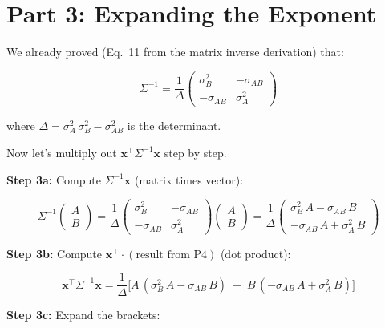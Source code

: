 \documentclass[11pt, a4paper]{article}
\begin{document}
\section*{\color{secblue}Part 3: Expanding the Exponent}

We already proved (Eq.~11 from the matrix inverse derivation) that:

\begin{equation}
\Sigma^{-1} = \frac{1}{\Delta}
\begin{pmatrix} \sigma_B^2 & -\sigma_{AB} \\ -\sigma_{AB} & \sigma_A^2 \end{pmatrix}
\tag{P3}
\end{equation}

where $\Delta = \sigma_A^2 \,\sigma_B^2 - \sigma_{AB}^2$ is the determinant.

\bigskip
Now let's multiply out $\mathbf{x}^\top \Sigma^{-1} \mathbf{x}$ step by step.

\textbf{Step 3a:} Compute $\Sigma^{-1} \mathbf{x}$ (matrix times vector):

\begin{equation}
\Sigma^{-1} \begin{pmatrix} A \\ B \end{pmatrix}
= \frac{1}{\Delta}
\begin{pmatrix} \sigma_B^2 & -\sigma_{AB} \\ -\sigma_{AB} & \sigma_A^2 \end{pmatrix}
\begin{pmatrix} A \\ B \end{pmatrix}
= \frac{1}{\Delta}
\begin{pmatrix} \sigma_B^2 \,A - \sigma_{AB}\, B \\ -\sigma_{AB}\, A + \sigma_A^2\, B \end{pmatrix}
\tag{P4}
\end{equation}

\textbf{Step 3b:} Compute $\mathbf{x}^\top \cdot (\text{result from P4})$ (dot product):

\begin{equation}
\mathbf{x}^\top \Sigma^{-1} \mathbf{x}
= \frac{1}{\Delta} \Big[ A\,(\sigma_B^2\, A - \sigma_{AB}\, B) \;+\; B\,(-\sigma_{AB}\, A + \sigma_A^2\, B) \Big]
\tag{P5}
\end{equation}

\textbf{Step 3c:} Expand the brackets:
\end{document}
